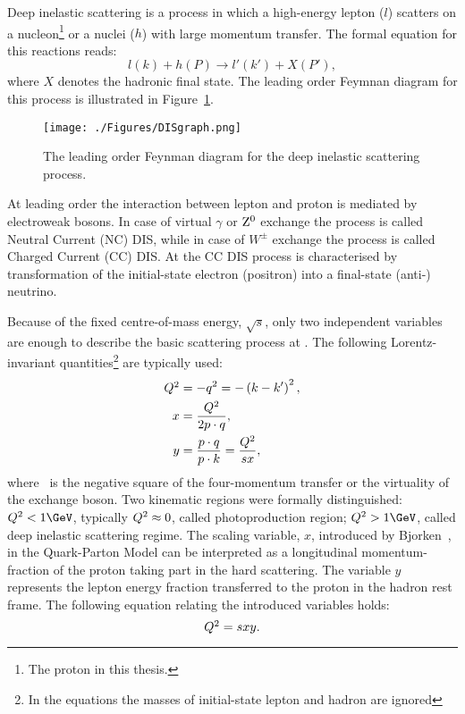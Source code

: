 Deep inelastic scattering is a process in which a high-energy lepton ($l$) scatters on a nucleon\footnote{The proton in this thesis.} or a nuclei ($h$) with large momentum transfer. The formal equation for this reactions reads:
\begin{equation}
l\left( k \right) + h\left( P \right) \rightarrow l'\left( k' \right) + X\left( P' \right),
\label{eq:DISreactions}
\end{equation}
where $X$ denotes the hadronic final state. The leading order Feymnan diagram for this process is illustrated in Figure~\ref{fig:DISgraph}.
\begin{figure}
	\centering
		\texttt{[image: ./Figures/DISgraph.png]}
	\caption{The leading order Feynman diagram for the deep inelastic scattering process.}
	\label{fig:DISgraph}
\end{figure}
At leading order the interaction between lepton and proton is mediated by electroweak bosons. In case of virtual $\gamma$ or $\mbox{$\rm{Z}^0$}$ exchange the process is called Neutral Current (NC) DIS, while in case of $W^\pm$ exchange the process is called Charged Current (CC) DIS. At \hera the CC DIS process is characterised by transformation of the initial-state electron (positron) into a final-state (anti-) neutrino.

Because of the fixed centre-of-mass energy, $\sqrt{s}$, only two independent variables are enough to describe the basic scattering process at \hera. The following Lorentz-invariant quantities\footnote{In the equations the masses of initial-state lepton and hadron are ignored} are typically used:
\begin{align}
\mbox{${Q^2}$} &= -q^2 = -\left( k - k' \right)^2,\\
     x &= \frac{\mbox{${Q^2}$}}{2p\cdot q},\\
		 y &= \frac{p\cdot q}{p\cdot k} = \frac{\mbox{${Q^2}$}}{sx},
\label{eq:vardefinit}
\end{align}
where \qsq\, is the negative square of the four-momentum transfer or the virtuality of the exchange boson. Two kinematic regions were formally distinguished: $\qsq < 1\GeV$, typically $\mbox{${Q^2}$} \approx 0$, called photoproduction region; $\qsq > 1\GeV$, called deep inelastic scattering regime. The scaling variable, $x$, introduced by Bjorken~\cite{bjorken}, in the Quark-Parton Model can be interpreted as a longitudinal momentum-fraction of the proton taking part in the hard scattering. The variable $y$ represents the lepton energy fraction transferred to the proton in the hadron rest frame. The following equation relating the introduced variables holds:
\begin{equation}
\mbox{${Q^2}$} = sxy.
\label{eq:qsxy}
\end{equation}

